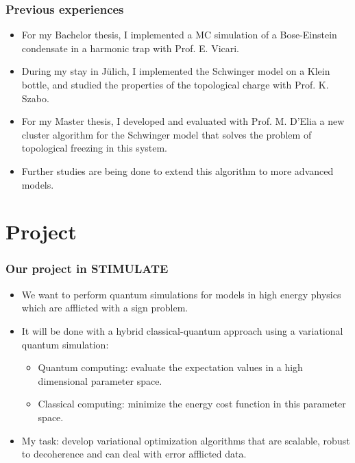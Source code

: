 \documentclass[11pt,t,xcolor=dvipsnames,aspectratio=169]{beamer}
\begin{document}
\begin{frame}
    \frametitle{Previous experiences}
    \begin{itemize}
        \item
            For my Bachelor thesis, I implemented a MC simulation of a Bose-Einstein condensate in a harmonic trap with Prof. E. Vicari.
        \item
            During my stay in J\"ulich, I implemented the Schwinger model on a Klein bottle, and studied the properties of the topological charge with Prof. K. Szabo.
        \item
            For my Master thesis, 
            I developed and evaluated with Prof. M. D'Elia
            a new cluster algorithm for the Schwinger model that solves the problem of topological freezing in this system.
        \item
            Further studies are being done to extend this algorithm to more advanced models.
    \end{itemize}
\end{frame}

\section{Project}

\begin{frame}
    \frametitle{Our project in STIMULATE}
    \begin{itemize}
        \item
            We want to perform quantum simulations for models in high energy physics which are afflicted with a sign problem.
        \item
            It will be done with a hybrid classical-quantum approach using a variational quantum simulation:
            \begin{itemize}
                \item
                    Quantum computing: evaluate the expectation values in a high dimensional parameter space.
                \item
                    Classical computing: minimize the energy cost function in this parameter space.
            \end{itemize}
        \item
            My task: develop variational optimization algorithms that are scalable,
            robust to decoherence and can deal with error afflicted data.
    \end{itemize}
\end{frame}
\end{document}
